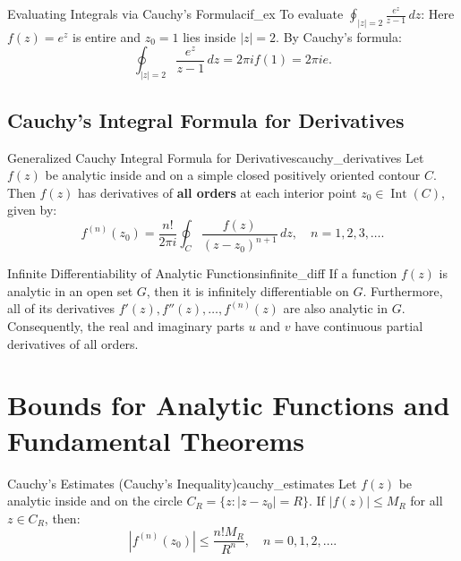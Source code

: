 \begin{example}{Evaluating Integrals via Cauchy's Formula}{cif_ex}
To evaluate $\oint_{|z|=2} \frac{e^z}{z - 1}\, dz$:
Here $f(z) = e^z$ is entire and $z_0 = 1$ lies inside $|z| = 2$. By Cauchy's formula:
\begin{equation}
\oint_{|z|=2} \frac{e^z}{z - 1}\, dz = 2\pi i f(1) = 2\pi i e.
\end{equation}
\end{example}

\subsection{Cauchy's Integral Formula for Derivatives}

\begin{theorem}{Generalized Cauchy Integral Formula for Derivatives}{cauchy_derivatives}
Let $f(z)$ be analytic inside and on a simple closed positively oriented contour $C$. Then $f(z)$ has derivatives of \textbf{all orders} at each interior point $z_0 \in \operatorname{Int}(C)$, given by:
\begin{equation}
f^{(n)}(z_0) = \frac{n!}{2\pi i} \oint_C \frac{f(z)}{(z - z_0)^{n+1}}\, dz, \quad n = 1, 2, 3, \dots.
\end{equation}
\end{theorem}

\begin{proposition}{Infinite Differentiability of Analytic Functions}{infinite_diff}
If a function $f(z)$ is analytic in an open set $G$, then it is infinitely differentiable on $G$. Furthermore, all of its derivatives $f'(z), f''(z), \dots, f^{(n)}(z)$ are also analytic in $G$.
Consequently, the real and imaginary parts $u$ and $v$ have continuous partial derivatives of all orders.
\end{proposition}


\section{Bounds for Analytic Functions and Fundamental Theorems}

\begin{theorem}{Cauchy's Estimates (Cauchy's Inequality)}{cauchy_estimates}
Let $f(z)$ be analytic inside and on the circle $C_R = \{z : |z - z_0| = R\}$. If $|f(z)| \le M_R$ for all $z \in C_R$, then:
\begin{equation}
|f^{(n)}(z_0)| \le \frac{n! M_R}{R^n}, \quad n = 0, 1, 2, \dots.
\end{equation}
\end{theorem}

